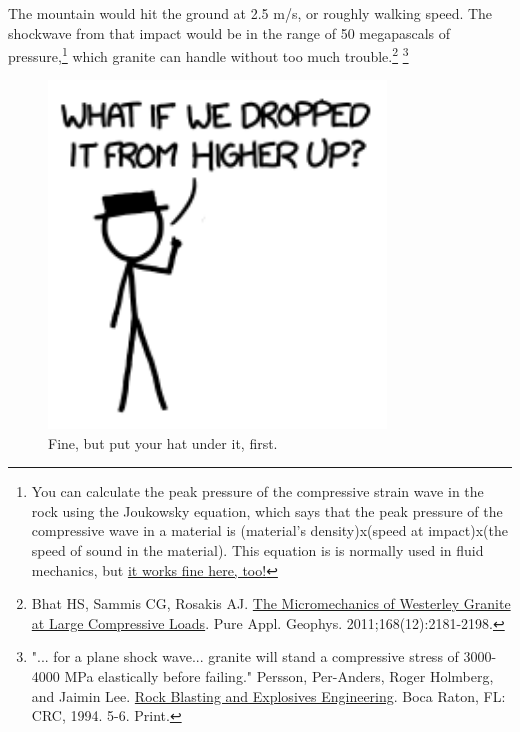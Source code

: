 {{The mountain would hit the ground at 2.5 m/s, or roughly walking speed. The shockwave from that impact would be in the range of 50 megapascals of pressure,{\footnote{You can calculate the peak pressure of the compressive strain wave in the rock using the Joukowsky equation, which says that the peak pressure of the compressive wave in a material is (material's density)x(speed at impact)x(the speed of sound in the material). This equation is is normally used in fluid mechanics, but \href{http://www.win.tue.nl/analysis/reports/rana06-08.pdf}{it works fine here, too!}} } which granite can handle without too much trouble.{\footnote{Bhat HS, Sammis CG, Rosakis AJ. \href{http://www.rosakis.caltech.edu/downloads/pubs/2011/181\%20The\%20Micromechanics\%20of\%20Westerley.pdf}{The Micromechanics of Westerley Granite at Large Compressive Loads}. Pure Appl. Geophys. 2011;168(12):2181-2198.} } {\footnote{"... for a plane shock wave... granite will stand a compressive stress of 3000-4000 MPa elastically before failing." Persson, Per-Anders, Roger Holmberg, and Jaimin Lee. \href{http://books.google.com/books?id=sdLO5HESJwgC&lpg=PA5&ots=-SJy8Yx-ea&pg=PA5\#v=onepage&q&f=false} {Rock Blasting and Explosives Engineering}. Boca Raton, FL: CRC, 1994. 5-6. Print.} } }

\begin{figure}[!htbp]
\centering
\includegraphics[scale=0.5, max width=0.8\textwidth]{imgs/a/57/mountain_hat.png}
\caption{Fine, but put your hat under it, first.}
\end{figure}

}
